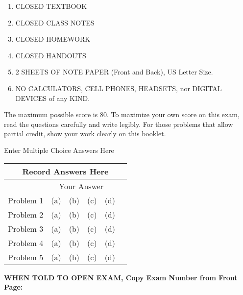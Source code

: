 \documentclass[letterpaper]{article}
\newcommand{\bline}[1]{\underline{\hspace*{#1}}}
\begin{document}
\vspace*{.45in} 
\begin{enumerate}
\item CLOSED TEXTBOOK
\item CLOSED CLASS NOTES
\item CLOSED HOMEWORK
\item CLOSED HANDOUTS
\item 2  SHEETS OF NOTE PAPER (Front and Back), US Letter Size.
\item NO CALCULATORS, CELL PHONES, HEADSETS, nor DIGITAL DEVICES of any KIND.
\end{enumerate}
\vspace*{.4in}


\noindent The maximum possible score is 80. To maximize your own score on this exam, read the questions carefully and write legibly.  For those problems that allow partial credit, show your work clearly on this booklet.

\newpage

\vspace*{4cm}

\begin{center}
\bf

\Large
Enter Multiple Choice Answers Here
\end{center}

\vspace*{4cm}

\begin{center}
\LARGE
\begin{tabular}{|p{1.2in}|p{1.5in}|}
\hline
\multicolumn{2}{|c|}{\textbf{Record Answers Here}}\\
\hline
 & ~~Your Answer\\
\hline
Problem 1 &   (a)~~(b)~~(c)~~(d)~~\\
\hline
Problem 2 &   (a)~~(b)~~(c)~~(d)~~\\
\hline
Problem 3 &   (a)~~(b)~~(c)~~(d)~~\\
\hline
Problem 4 &   (a)~~(b)~~(c)~~(d)~~\\
\hline
Problem 5 &   (a)~~(b)~~(c)~~(d)~~\\
\hline
\end{tabular}
\end{center}

\newpage

\begin{flushright}
{\bf \large WHEN TOLD TO OPEN EXAM, Copy Exam Number from Front Page:}\bline{1.0in}
\end{flushright}
\end{document}
